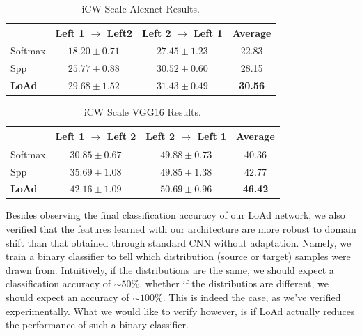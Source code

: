 \documentclass[../main.tex]{subfiles}
\begin{document}
    \begin{table}[!ht]
        \centering{}
        \begin{tabular}{l c c c}
            \toprule
                     & Left 1 $\rightarrow$ Left2 & Left 2 $\rightarrow$ Left 1 & Average \\
            \midrule
            Softmax  & $18.20 \pm{} 0.71$ & $27.45 \pm{} 1.23$ & 22.83 \\
            Spp      & $25.77 \pm{} 0.88$ & $30.52 \pm{} 0.60$ & 28.15 \\
        \textbf{LoAd} & $\mathbf{29.68 \pm{} 1.52}$ & $\mathbf{31.43 \pm{} 0.49}$ & \textbf{30.56} \\
            \bottomrule
        \end{tabular}
        \caption{iCW Scale Alexnet Results.}
    \end{table}
    
    \begin{table}[!ht]
        \centering{}
        \begin{tabular}{l c c c}
            \toprule
                     & Left 1 $\rightarrow$ Left 2 & Left 2 $\rightarrow$ Left 1 & Average \\
            \midrule
            Softmax  & $30.85 \pm{} 0.67$ & $49.88 \pm{} 0.73$ & 40.36 \\
            Spp      & $35.69 \pm{} 1.08$ & $49.85 \pm{} 1.38$ & 42.77 \\
        \textbf{LoAd} & $\mathbf{42.16 \pm{} 1.09}$ & $\mathbf{50.69 \pm{} 0.96}$ & \textbf{46.42} \\
            \bottomrule
        \end{tabular}
        \caption{iCW Scale VGG16 Results.}
    \end{table}
    
    Besides observing the final classification accuracy of our LoAd network, we also verified that the features
    learned with our architecture are more robust to domain shift than that obtained through standard CNN without
    adaptation. Namely, we train a binary classifier to tell which distribution (source or target) samples were drawn from.
    Intuitively, if the distributions are the same, we should expect a classification accuracy of $\sim 50\%$,
    whether if the distributios are different, we should expect an accuracy of $\sim 100\%$.
    This is indeed the case, as we've verified experimentally. What we would like to verify however, is if
    LoAd actually reduces the performance of such a binary classifier. 
\end{document}
